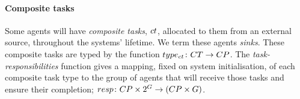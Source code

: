 \paragraph{Composite tasks}
\label{section:problem:composite_tasks}
\newcommand{\formalTaskResponsibilities}[2]{
	\functionFormal{resp}
	{\setCompositeTaskType{}{} \times \powerSetAgent{}{}{}{}}
	({\setCompositeTaskType{}{} \times \setAgent{}{}})
}
\newcommand{\functionTaskResponsibilities}[2]{
	\functionSignature{resp}
	{\varCompositeTaskType{}{}, \setAgent{}{}}
}

\newcommand{\formalCompositeTaskType}[2]{
	\functionFormal{type_{\varCompositeTask{}{}}}
	{\setCompositeTask{}{}}
	{\setCompositeTaskType{}{}}
}
\newcommand{\functionCompositeTaskType}[2]{
	\functionSignature{type_{\varCompositeTask{}{}}}
	{\varCompositeTask{#1}{#2}}
}

Some agents will have \textit{composite tasks}, $\varCompositeTask{}{}$, allocated to them from an external source, throughout the systems' lifetime. We term these agents \textit{sinks}. These composite tasks are typed by the function $\formalCompositeTaskType{}{}$. The \textit{task-responsibilities} function gives a mapping, fixed on system initialisation, of each composite task type  to the group of agents that will receive those tasks and ensure their completion; $\formalTaskResponsibilities{}{}$.

\newcommand{\formalTaskDemandPoint}[2]{
	\functionFormal{demand}
	{\setAtomicTask  {}{}}{\tupleLocation{}{}}
}
\newcommand{\functionTaskDemandPoint}[2]{\functionSignature{demand}{\varAtomicTask{#1}{#2}}}

\newcommand{\functionRequiredResourcesSymbol}[2]{
	\functionSymbol{demandres}
}
\newcommand{\formalRequiredResources}[2]{
	\functionFormal{\functionRequiredResourcesSymbol{}{}}
	{\setAtomicTaskType{#1}{} \times \setResourceType{#2}{}}
	{\setRealNumbersNonNegative{}{}}
}
\newcommand{\functionRequiredResources}[2]{
	\functionSignature{\functionRequiredResourcesSymbol{}{}}{\varAtomicTaskType{#1}{}, \varResourceType{#2}{}}
}
\newcommand{\functionRequiredResourcesInstance}[2]{
	\functionSignature{\functionRequiredResourcesSymbol{}{}}
	{\functionAtomicTaskMapping{\varAtomicTask{#1}{}}{}, \varResourceType{#2}{}}
}

\newcommand{\formalAtomicTaskType}[2]{
	\functionFormal{type_{\varAtomicTask{}{}}}
	{\setAtomicTask{}{}}
	{\setAtomicTaskType{}{}}
}
\newcommand{\functionAtomicTaskType}[2]{
	\functionSignatyre{type_{\varAtomicTask{}{}}}
	{\varAtomicTask{#1}{#2}}
}

